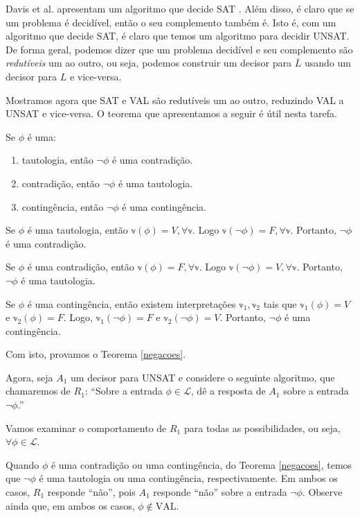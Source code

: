 Davis et al. apresentam um algoritmo que decide SAT \cite{davis1960computing}. Além disso, é claro que se um problema é decidível, então o seu complemento também é. Isto é, com um algoritmo que decide SAT, é claro que temos um algoritmo para decidir UNSAT. De forma geral, podemos dizer que um problema decidível e seu complemento são \emph{redutíveis} um ao outro, ou seja, podemos construir um decisor para $\overline{L}$ usando um decisor para $L$ e vice-versa.

Mostramos agora que SAT e VAL são redutíveis um ao outro, reduzindo VAL a UNSAT e vice-versa. O teorema que apresentamos a seguir é útil nesta tarefa.

\begin{theorem}
	\label{negacoes}
	Se $\phi$ é uma:
	\begin{enumerate}
		\item tautologia, então $\neg \phi$ é uma contradição.
		\item contradição, então $\neg \phi$ é uma tautologia.
		\item contingência, então $\neg \phi$ é uma contingência.
	\end{enumerate}
\end{theorem}

Se $\phi$ é uma tautologia, então $\mathbb{v}(\phi) = V, \forall \mathbb{v}$. Logo $\mathbb{v}(\neg \phi) = F, \forall \mathbb{v}$. Portanto, $\neg \phi$ é uma contradição.

Se $\phi$ é uma contradição, então $\mathbb{v}(\phi) = F, \forall \mathbb{v}$. Logo $\mathbb{v}(\neg \phi) = V, \forall \mathbb{v}$. Portanto, $\neg \phi$ é uma tautologia.

Se $\phi$ é uma contingência, então existem interpretações $\mathbb{v}_1,\mathbb{v}_2$ tais que $\mathbb{v}_1(\phi) = V$ e $\mathbb{v}_2(\phi) = F$. Logo, $\mathbb{v}_1(\neg \phi) = F$ e $\mathbb{v}_2(\neg \phi) = V$. Portanto, $\neg \phi$ é uma contingência.

Com isto, provamos o Teorema \ref{negacoes}.

Agora, seja $A_1$ um decisor para UNSAT e considere o seguinte algoritmo, que chamaremos de $R_1$: ``Sobre a entrada $\phi \in \mathcal{L}$, dê a resposta de $A_1$ sobre a entrada $\neg \phi$.''

Vamos examinar o comportamento de $R_1$ para todas as possibilidades, ou seja, $\forall \phi \in \mathcal{L}$.

Quando $\phi$ é uma contradição ou uma contingência, do Teorema \ref{negacoes}, temos que $\neg \phi$ é uma tautologia ou uma contingência, respectivamente. Em ambos os casos, $R_1$ responde ``não'', pois $A_1$ responde ``não'' sobre a entrada $\neg \phi$. Observe ainda que, em ambos os casos, $\phi \notin \text{VAL}$.

